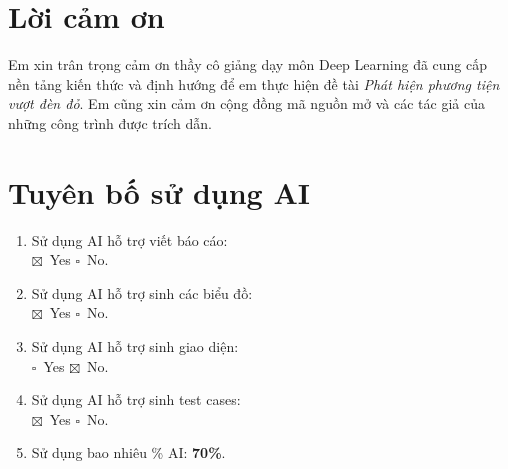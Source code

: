 \documentclass[11pt,a4paper]{article}
\newcommand{\unchecked}{\(\square\)}
\newcommand{\checked}{\(\boxtimes\)}
\begin{document}
\section*{Lời cảm ơn}
Em xin trân trọng cảm ơn thầy cô giảng dạy môn Deep Learning đã cung cấp nền tảng kiến thức và định hướng để em thực hiện đề tài \textit{Phát hiện phương tiện vượt đèn đỏ}. Em cũng xin cảm ơn cộng đồng mã nguồn mở và các tác giả của những công trình được trích dẫn.

\clearpage
\onecolumn
\renewcommand{\contentsname}{Mục lục}
\tableofcontents

\clearpage
\section*{Tuyên bố sử dụng AI}
\begin{enumerate}
  \item Sử dụng AI hỗ trợ viết báo cáo:\\
        \checked\ Yes \qquad \unchecked\ No.
  \item Sử dụng AI hỗ trợ sinh các biểu đồ:\\
        \checked\ Yes \qquad \unchecked\ No.
  \item Sử dụng AI hỗ trợ sinh giao diện:\\
        \unchecked\ Yes \qquad \checked\ No.
  \item Sử dụng AI hỗ trợ sinh test cases:\\
        \checked\ Yes \qquad \unchecked\ No.
  \item Sử dụng bao nhiêu \% AI: \textbf{70\%}.
\end{enumerate}
\end{document}
